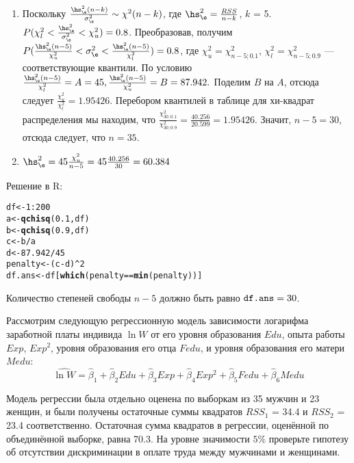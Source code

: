 \documentclass[pdftex,11pt,openany]{book}\usepackage[]{graphicx}\usepackage[]{color}
\makeatletter
\newcommand{\hlnum}[1]{\textcolor[rgb]{0.686,0.059,0.569}{#1}}%
\newcommand{\hlopt}[1]{\textcolor[rgb]{0,0,0}{#1}}%
\newcommand{\hlstd}[1]{\textcolor[rgb]{0.345,0.345,0.345}{#1}}%
\newcommand{\hlkwb}[1]{\textcolor[rgb]{0.69,0.353,0.396}{#1}}%
\newcommand{\hlkwd}[1]{\textcolor[rgb]{0.737,0.353,0.396}{\textbf{#1}}}%
\newenvironment{kframe}{%
 \def\at@end@of@kframe{}%
 \ifinner\ifhmode%
  \def\at@end@of@kframe{\end{minipage}}%
  \begin{minipage}{\columnwidth}%
 \fi\fi%
 \def\FrameCommand##1{\hskip\@totalleftmargin \hskip-\fboxsep
 \colorbox{shadecolor}{##1}\hskip-\fboxsep
     \hskip-\linewidth \hskip-\@totalleftmargin \hskip\columnwidth}%
 \MakeFramed {\advance\hsize-\width
   \@totalleftmargin\z@ \linewidth\hsize
   \@setminipage}}%
 {\par\unskip\endMakeFramed%
 \at@end@of@kframe}
\newenvironment{knitrout}{}{} %
\makeatother
\begin{document}
\begin{solution}
\begin{enumerate}
\item Поскольку $\frac{\hs_{\e}^2(n-k)}{\sigma_{\e}^2} \sim \chi ^2(n-k)$, где $\hs_{\e}^2 = \frac{RSS}{n-k}$, $k$ = 5. $P(\chi_{l}^2 < \frac{\hs_{\e}^2}{\sigma_{\e}^2} < \chi_{u}^2) = 0.8$. Преобразовав, получим $P(\frac{\hs_{\e}^2(n-5)}{\chi_{u}^2} < \sigma_{\e}^2 < \frac{\hs_{\e}^2(n-5)}{\chi_{l}^2}) = 0.8$, где $\chi_{u}^2 = \chi_{n-5; 0.1} ^2$, $\chi_{l}^2 = \chi_{n-5; 0.9} ^2$ --- соответствующие квантили. По условию $\frac{\hs_{\e}^2(n-5)}{\chi_{l}^2} = A = 45, \frac{\hs_{\e}^2(n-5)}{\chi_{u}^2} = B = 87.942.$ Поделим $B$ на $A$, отсюда следует $\frac{\chi_{u}^2}{\chi_{l}^2} = 1.95426.$ Перебором квантилей в таблице для хи-квадрат распределения мы находим, что $\frac{\chi_{30; 0.1}^2}{\chi_{30; 0.9}^2} = \frac{40.256}{20.599} = 1.95426.$ Значит, $n - 5 = 30$, отсюда следует, что $n = 35.$
\item $\hs_{\e}^2 = 45 \frac{\chi_{u}^2}{n-5} = 45 \frac{40.256}{30} = 60.384$ 
\end{enumerate}

Решение в R:
\begin{knitrout}
\color{fgcolor}\begin{kframe}
\begin{alltt}
\hlstd{df} \hlkwb{<-} \hlnum{1}\hlopt{:}\hlnum{200}
\hlstd{a} \hlkwb{<-} \hlkwd{qchisq}\hlstd{(}\hlnum{0.1}\hlstd{,df)}
\hlstd{b} \hlkwb{<-} \hlkwd{qchisq}\hlstd{(}\hlnum{0.9}\hlstd{,df)}
\hlstd{c} \hlkwb{<-} \hlstd{b}\hlopt{/}\hlstd{a}
\hlstd{d} \hlkwb{<-} \hlnum{87.942}\hlopt{/}\hlnum{45}
\hlstd{penalty} \hlkwb{<-} \hlstd{(c}\hlopt{-}\hlstd{d)}\hlopt{^}\hlnum{2}
\hlstd{df.ans} \hlkwb{<-} \hlstd{df[}\hlkwd{which}\hlstd{(penalty}\hlopt{==}\hlkwd{min}\hlstd{(penalty))]}
\end{alltt}
\end{kframe}
\end{knitrout}
Количество степеней свободы $n-5$ должно быть равно $\verb|df.ans|=30$.

\end{solution}

\begin{problem}  %
 Рассмотрим следующую регрессионную модель зависимости логарифма заработной платы индивида $\ln W$ от его уровня образования $Edu$, опыта работы $Exp$, $Exp^2$, уровня образования его отца $Fedu$, и уровня образования его матери $Medu$:
\[
\widehat{\ln W}=\hat{\beta}_1+\hat{\beta}_2Edu+\hat{\beta}_3Exp+\hat{\beta}_4Exp^2+\hat{\beta}_5Fedu+\hat{\beta}_6Medu
\]

Модель регрессии была отдельно оценена по выборкам из 35 мужчин и 23 женщин, и были получены остаточные суммы квадратов $RSS_1$ = 34.4 и $RSS_2$ = 23.4 соответственно. Остаточная сумма квадратов в регрессии, оценённой по объединённой выборке, равна 70.3. На уровне значимости $5\%$ проверьте гипотезу об отсутствии дискриминации в оплате труда между мужчинами и женщинами.
\end{problem}
\end{document}

